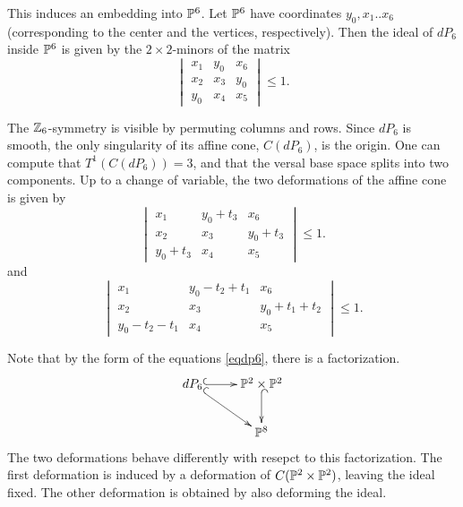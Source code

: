 \documentclass[11pt, english]{article}
\begin{document}
This induces an embedding into $\mathbb{P}^6$. Let $\mathbb{P}^6$ have coordinates $y_0,x_1..x_6$ (corresponding to the center and the vertices, respectively). Then the ideal of $dP_6$ inside $\mathbb{P}^6$ is given by the $2 \times 2$-minors of the matrix
\begin{equation}
\label{eqdp6}
\begin{vmatrix}
x_1 & y_0 & x_6 \\
x_2 & x_3 & y_0 \\
y_0 & x_4 & x_5
\end{vmatrix} \leq 1.
\end{equation}

The $\mathbb{Z}_6$-symmetry is visible by permuting columns and rows. Since $dP_6$ is smooth, the only singularity of its affine cone, $C(dP_6)$, is the origin. One can compute that $T^1(C(dP_6))=3$, and that the versal base space splits into two components. Up to a change of variable, the two deformations of the affine cone is given by
\[
\begin{vmatrix}
x_1 & y_0+t_3 & x_6 \\
x_2 & x_3 & y_0+t_3 \\
y_0+t_3 & x_4 & x_5
\end{vmatrix} \leq 1.
\]
and 
\[
\begin{vmatrix}
x_1 & y_0-t_2+t_1 & x_6 \\
x_2 & x_3 & y_0+t_1+t_2 \\
y_0-t_2-t_1 & x_4 & x_5
\end{vmatrix} \leq 1.
\]

Note that by the form of the equations \eqref{eqdp6}, there is a factorization.
\[
\xymatrix{
dP_6  \ar@{^(->}[r] \ar@{^(->}[dr]& \PP^2 \times \PP^2 \ar@{^(->}[d] \\
& \PP^8
}
\]
The two deformations behave differently with resepct to this factorization. The first deformation is induced by a deformation of $C(\mathbb{P}^2 \times \mathbb{P}^2)$, leaving the ideal fixed. The other deformation is obtained by also deforming the ideal.
\end{document}
